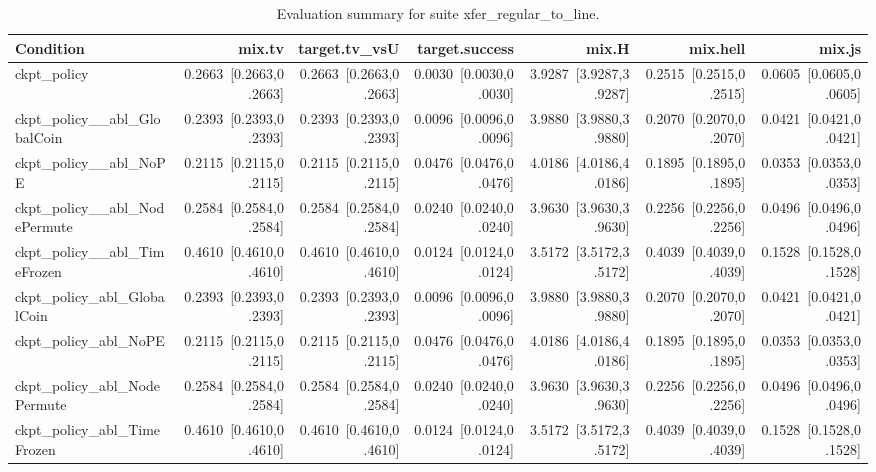 \begin{table}[t]
\centering
\caption{Evaluation summary for suite xfer_regular_to_line.}
\label{tab:eval_xfer_regular_to_line}
\begin{tabular}{lrrrrrr}
\toprule
Condition & mix.tv & target.tv\_vsU & target.success & mix.H & mix.hell & mix.js \\
\midrule
ckpt\_policy & 0.2663~[0.2663,0.2663] & 0.2663~[0.2663,0.2663] & 0.0030~[0.0030,0.0030] & 3.9287~[3.9287,3.9287] & 0.2515~[0.2515,0.2515] & 0.0605~[0.0605,0.0605] \\
ckpt\_policy\_\_abl\_GlobalCoin & 0.2393~[0.2393,0.2393] & 0.2393~[0.2393,0.2393] & 0.0096~[0.0096,0.0096] & 3.9880~[3.9880,3.9880] & 0.2070~[0.2070,0.2070] & 0.0421~[0.0421,0.0421] \\
ckpt\_policy\_\_abl\_NoPE & 0.2115~[0.2115,0.2115] & 0.2115~[0.2115,0.2115] & 0.0476~[0.0476,0.0476] & 4.0186~[4.0186,4.0186] & 0.1895~[0.1895,0.1895] & 0.0353~[0.0353,0.0353] \\
ckpt\_policy\_\_abl\_NodePermute & 0.2584~[0.2584,0.2584] & 0.2584~[0.2584,0.2584] & 0.0240~[0.0240,0.0240] & 3.9630~[3.9630,3.9630] & 0.2256~[0.2256,0.2256] & 0.0496~[0.0496,0.0496] \\
ckpt\_policy\_\_abl\_TimeFrozen & 0.4610~[0.4610,0.4610] & 0.4610~[0.4610,0.4610] & 0.0124~[0.0124,0.0124] & 3.5172~[3.5172,3.5172] & 0.4039~[0.4039,0.4039] & 0.1528~[0.1528,0.1528] \\
ckpt\_policy\_abl\_GlobalCoin & 0.2393~[0.2393,0.2393] & 0.2393~[0.2393,0.2393] & 0.0096~[0.0096,0.0096] & 3.9880~[3.9880,3.9880] & 0.2070~[0.2070,0.2070] & 0.0421~[0.0421,0.0421] \\
ckpt\_policy\_abl\_NoPE & 0.2115~[0.2115,0.2115] & 0.2115~[0.2115,0.2115] & 0.0476~[0.0476,0.0476] & 4.0186~[4.0186,4.0186] & 0.1895~[0.1895,0.1895] & 0.0353~[0.0353,0.0353] \\
ckpt\_policy\_abl\_NodePermute & 0.2584~[0.2584,0.2584] & 0.2584~[0.2584,0.2584] & 0.0240~[0.0240,0.0240] & 3.9630~[3.9630,3.9630] & 0.2256~[0.2256,0.2256] & 0.0496~[0.0496,0.0496] \\
ckpt\_policy\_abl\_TimeFrozen & 0.4610~[0.4610,0.4610] & 0.4610~[0.4610,0.4610] & 0.0124~[0.0124,0.0124] & 3.5172~[3.5172,3.5172] & 0.4039~[0.4039,0.4039] & 0.1528~[0.1528,0.1528] \\
\bottomrule
\end{tabular}
\end{table}
